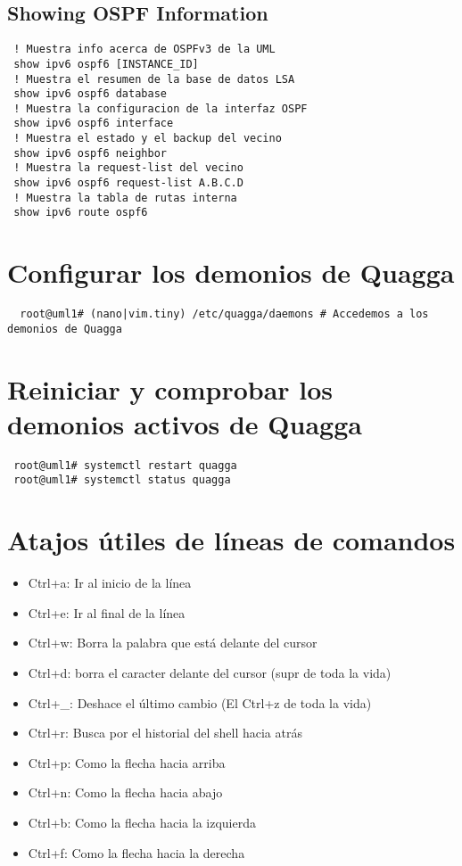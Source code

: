 \documentclass{article}
\begin{document}
\subsection{Showing OSPF Information}
\begin{verbatim}
 ! Muestra info acerca de OSPFv3 de la UML
 show ipv6 ospf6 [INSTANCE_ID]
 ! Muestra el resumen de la base de datos LSA
 show ipv6 ospf6 database
 ! Muestra la configuracion de la interfaz OSPF
 show ipv6 ospf6 interface
 ! Muestra el estado y el backup del vecino
 show ipv6 ospf6 neighbor
 ! Muestra la request-list del vecino
 show ipv6 ospf6 request-list A.B.C.D
 ! Muestra la tabla de rutas interna
 show ipv6 route ospf6
\end{verbatim}

\section{Configurar los demonios de Quagga}
\begin{verbatim}
  root@uml1# (nano|vim.tiny) /etc/quagga/daemons # Accedemos a los demonios de Quagga
\end{verbatim}

\section{Reiniciar y comprobar los demonios activos de Quagga}
\begin{verbatim}
 root@uml1# systemctl restart quagga
 root@uml1# systemctl status quagga
\end{verbatim}

\section{Atajos útiles de líneas de comandos}
\begin{itemize}
  \item Ctrl+a: Ir al inicio de la línea
  \item Ctrl+e: Ir al final de la línea
  \item Ctrl+w: Borra la palabra que está delante del cursor
  \item Ctrl+d: borra el caracter delante del cursor (supr de toda la vida)
  \item Ctrl+\_: Deshace el último cambio (El Ctrl+z de toda la vida)
  \item Ctrl+r: Busca por el historial del shell hacia atrás
  \item Ctrl+p: Como la flecha hacia arriba
  \item Ctrl+n: Como la flecha hacia abajo
  \item Ctrl+b: Como la flecha hacia la izquierda
  \item Ctrl+f: Como la flecha hacia la derecha
\end{itemize}
\end{document}

